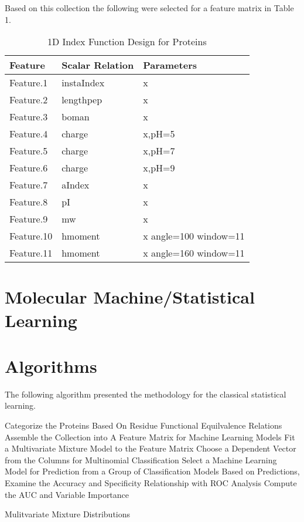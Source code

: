 Based on this collection the following were selected for a feature matrix in Table 1.

\begin{table}[H]\tiny
  \caption{1D Index Function Design for Proteins }
\begin{tabular}{p{1cm}p{1cm}p{5cm}}
\hline 
Feature & Scalar Relation & Parameters \\
\hline 
Feature.1 & instaIndex & x \\
Feature.2 & lengthpep & x \\
Feature.3 & boman & x \\
\hline 
Feature.4 & charge & x,pH=5 \\
Feature.5 & charge & x,pH=7 \\
Feature.6 & charge & x,pH=9 \\
\hline 
Feature.7 & aIndex & x \\
Feature.8 & pI & x \\
Feature.9 & mw & x \\
\hline 
Feature.10 & hmoment & x angle=100 window=11 \\
Feature.11 & hmoment & x angle=160 window=11 \\
\hline
\end{tabular}
\end{table}

\section{Molecular Machine/Statistical Learning}

\section{Algorithms}

The following algorithm presented the methodology for the classical statistical learning.
\footnotesize
\begin{algorithm}[H]
\begin{algorithmic}[1]
\State Categorize the Proteins Based On Residue Functional Equilvalence Relations
\State Assemble the Collection into A Feature Matrix for Machine Learning Models
\State Fit a Multivariate Mixture Model to the Feature Matrix
\State Choose a Dependent Vector from the Columns for Multinomial Classification 
\State Select a Machine Learning Model for Prediction from a Group of Classification Models
\State Based on Predictions, Examine the Accuracy and Specificity Relationship with ROC Analysis
\State Compute the AUC and Variable Importance
\end{algorithmic}
\caption{ Mulitvariate Mixture Distributions }
\label{Multivariate_Distrib}
\end{algorithm}

